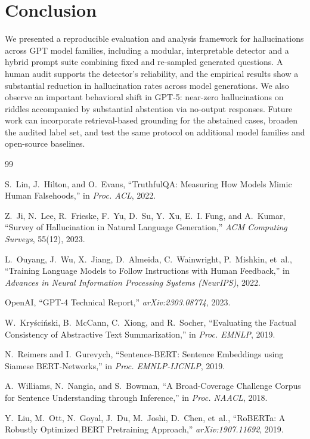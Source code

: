 \documentclass[11pt]{article}
\begin{document}
\section{Conclusion}
We presented a reproducible evaluation and analysis framework for hallucinations across GPT model families, including a modular, interpretable detector and a hybrid prompt suite combining fixed and re-sampled generated questions. A human audit supports the detector's reliability, and the empirical results show a substantial reduction in hallucination rates across model generations. We also observe an important behavioral shift in GPT-5: near-zero hallucinations on riddles accompanied by substantial abstention via no-output responses. Future work can incorporate retrieval-based grounding for the abstained cases, broaden the audited label set, and test the same protocol on additional model families and open-source baselines.

\begin{thebibliography}{99}

S.~Lin, J.~Hilton, and O.~Evans,
``TruthfulQA: Measuring How Models Mimic Human Falsehoods,''
in \emph{Proc. ACL}, 2022.

Z.~Ji, N.~Lee, R.~Frieske, F.~Yu, D.~Su, Y.~Xu, E.~I. Fung, and A.~Kumar,
``Survey of Hallucination in Natural Language Generation,''
\emph{ACM Computing Surveys}, 55(12), 2023.

L.~Ouyang, J.~Wu, X.~Jiang, D.~Almeida, C.~Wainwright, P.~Mishkin, et~al.,
``Training Language Models to Follow Instructions with Human Feedback,''
in \emph{Advances in Neural Information Processing Systems (NeurIPS)}, 2022.

OpenAI,
``GPT-4 Technical Report,''
\emph{arXiv:2303.08774}, 2023.

W.~Kry{\'s}ci{\'n}ski, B.~McCann, C.~Xiong, and R.~Socher,
``Evaluating the Factual Consistency of Abstractive Text Summarization,''
in \emph{Proc. EMNLP}, 2019.

N.~Reimers and I.~Gurevych,
``Sentence-BERT: Sentence Embeddings using Siamese BERT-Networks,''
in \emph{Proc. EMNLP-IJCNLP}, 2019.

A.~Williams, N.~Nangia, and S.~Bowman,
``A Broad-Coverage Challenge Corpus for Sentence Understanding through Inference,''
in \emph{Proc. NAACL}, 2018.

Y.~Liu, M.~Ott, N.~Goyal, J.~Du, M.~Joshi, D.~Chen, et~al.,
``RoBERTa: A Robustly Optimized BERT Pretraining Approach,''
\emph{arXiv:1907.11692}, 2019.

\end{thebibliography}
\end{document}
